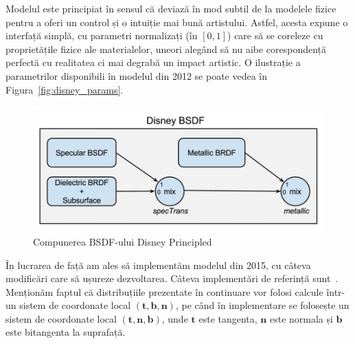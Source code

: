 \documentclass[12pt,a4paper]{report}
\numberwithin{equation}{section} %
\begin{document}
Modelul este principiat în sensul că deviază în mod subtil de la modelele fizice
pentru a oferi un control și o intuiție mai bună artistului. Astfel, acesta expune
o interfață simplă, cu parametri normalizați (în $[0, 1]$) care să se coreleze
cu proprietățile fizice ale materialelor, uneori alegând să nu aibe corespondență perfectă
cu realitatea ci mai degrabă un impact artistic. O ilustrație a parametrilor
disponibili în modelul din 2012 se poate vedea în Figura~\ref{fig:disney_params}.
\begin{figure}[!htb]
	\centering
	\includegraphics[width=\textwidth]{pics/disneybsdf.png}
	\caption{Compunerea BSDF-ului Disney Principled~\cite{DisneyBSDF}}
	\label{fig:disneybsdf}
\end{figure}

În lucrarea de față am ales să implementăm modelul din 2015, cu câteva modificări
care să ușureze dezvoltarea. Câteva implementări de referință sunt~\cite{DisneyHomework,DisneySchutte,GlslPathTracer}.
Menționăm faptul că distribuțiile prezentate în continuare vor folosi calcule
într-un sistem de coordonate local $(\mathbf{t}, \mathbf{b}, \mathbf{n})$,
pe când în implementare se folosește un sistem de coordonate local $(\mathbf{t}, \mathbf{n}, \mathbf{b})$,
unde $\mathbf{t}$ este tangenta, $\mathbf{n}$ este normala și $\mathbf{b}$ este bitangenta la suprafață.
\end{document}
